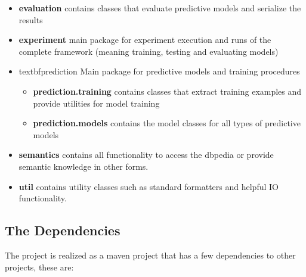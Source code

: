 \begin{itemize}
\begin{itemize}
\begin{itemize}
			\item \textbf{episode.pattern.recognition} contains classes implementing the episode recognition algorithms as described in algorithms \ref{alg_SerialEpisodeDetection} and \ref{alg_ParallelEpisodeDetection}.
			\item \textbf{episode.pattern.storage} contains classes implementing episode tries for efficient storage of episodes. Also see subsection \ref{sec_episodeTrie} for more details on how the data structure works.
		\end{itemize}
		\item \textbf{episode.unstable\textunderscore experimental\textunderscore lossy\textunderscore counting} Package that contains experimental, less sophisticated classes to experiment with episode mining using the lossy counting algorithm.
		\item TODO: change previous package name and subpackages?
	\end{itemize}
	\item \textbf{evaluation} contains classes that evaluate predictive models and serialize the results
	\item \textbf{experiment} main package for experiment execution and runs of the complete framework (meaning training, testing and evaluating models)
	\item textbf{prediction} Main package for predictive models and training procedures
	\begin{itemize}
		\item \textbf{prediction.training} contains classes that extract training examples and provide utilities for model training
		\item \textbf{prediction.models} contains the model classes for all types of predictive models
	\end{itemize}		
	\item \textbf{semantics} contains all functionality to access the dbpedia \cite{auer2007dbpedia} or provide semantic knowledge in other forms.
	\item \textbf{util} contains utility classes such as standard formatters and helpful IO functionality.
\end{itemize}

\subsection{The Dependencies}
The project is realized as a maven project that has a few dependencies to other projects, these are:

